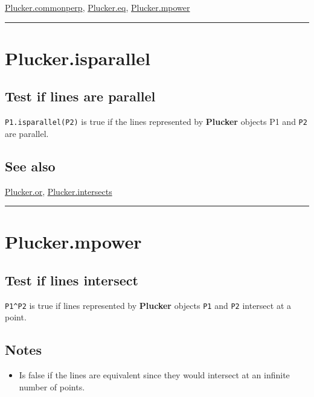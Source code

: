 \hyperlink{Plucker.commonperp}{\color{blue} Plucker.commonperp}, \hyperlink{Plucker.eq}{\color{blue} Plucker.eq}, \hyperlink{Plucker.mpower}{\color{blue} Plucker.mpower}

\vspace{1.5ex}\hrule

\hypertarget{Plucker.isparallel}{\section*{Plucker.isparallel}}
\subsection*{Test if lines are parallel}


\texttt{P1.isparallel(P2)} is true if the lines represented by \textbf{\color{red} Plucker} objects P1
and \texttt{P2} are parallel.


\subsection*{See also}


\hyperlink{Plucker.or}{\color{blue} Plucker.or}, \hyperlink{Plucker.intersects}{\color{blue} Plucker.intersects}

\vspace{1.5ex}\hrule

\hypertarget{Plucker.mpower}{\section*{Plucker.mpower}}
\subsection*{Test if lines intersect}


\texttt{P1\textasciicircum P2} is true if lines represented by \textbf{\color{red} Plucker} objects \texttt{P1}
and \texttt{P2} intersect at a point.


\subsection*{Notes}
\begin{itemize}
  \item Is false if the lines are equivalent since they would intersect at     an infinite number of points.
\end{itemize}

